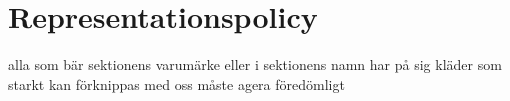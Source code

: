 \section{Representationspolicy}
alla som bär sektionens varumärke eller i sektionens namn har på sig kläder som starkt kan förknippas med oss måste agera föredömligt